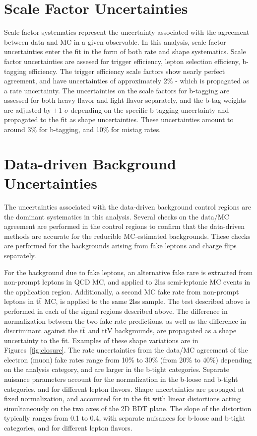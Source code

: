 \section{Scale Factor Uncertainties}
Scale factor systematics represent the uncertainty associated with the agreement between data and MC in a given observable. In this analysis,
scale factor uncertainties enter the fit in the form of both rate and shape systematics. Scale factor uncertainties are assesed for trigger efficiency,
lepton selection efficieny, b-tagging efficiency. The trigger efficiency scale factors show nearly perfect agreement, and have uncertainties of approximately
2$\%$ - which is propagated as a rate uncertainty. The uncertainties on the scale factors for b-tagging are assessed for both heavy flavor and light flavor separately,
and the b-tag weights are adjusted by $\pm$1 $\sigma$ depending on the specific b-tagging uncertainty and propagated to the fit as shape uncertainties.
These uncertainties amount to around 3$\%$ for b-tagging, and 10$\%$ for mistag rates.

\section{Data-driven Background Uncertainties}
The uncertainties associated with the data-driven background control regions are the dominant systematics in this analysis. 
Several checks on the data/MC agreement are performed in the control regions to confirm that the data-driven methods are accurate for the reducible MC-estimated
backgrounds. These checks are performed for the backgrounds arising from fake leptons and charge flips separately.

For the background due to fake leptons, an alternative fake rare is extracted from non-prompt leptons in QCD MC, and applied to 2lss semi-leptonic \ttbar MC events in the application region.
Additionally, a second MC fake rate from non-prompt leptons in $\mathrm{t}\overline{\mathrm{t}}$ MC,  is applied to the same 2lss sample.
The test described above is performed in each of the signal regions described above. 
The difference in normalization between the two fake rate predictions, as well as the difference in discriminant against the $\mathrm{t}\overline{\mathrm{t}}$ and ttV backgrounds,
are propagated as a shape uncertainty to the fit. Examples of these shape variations are in Figures~\ref{fig:closure}.
The rate uncertainties from the data/MC agreement of the electron (muon) fake rates range from 10\% to 30\% (from 20\% to 40\%) depending on the analysis category,
and are larger in the b-tight categories. Separate nuisance parameters account for the normalization in the b-loose and b-tight categories, and for different lepton flavors.
Shape uncertainties are propaged at fixed normalization, and accounted for in the fit with linear distortions acting simultaneously on the two axes of the 2D BDT plane.
The slope of the distortion typically ranges from 0.1 to 0.4, with separate nuisances for b-loose and b-tight categories, and for different lepton flavors.

